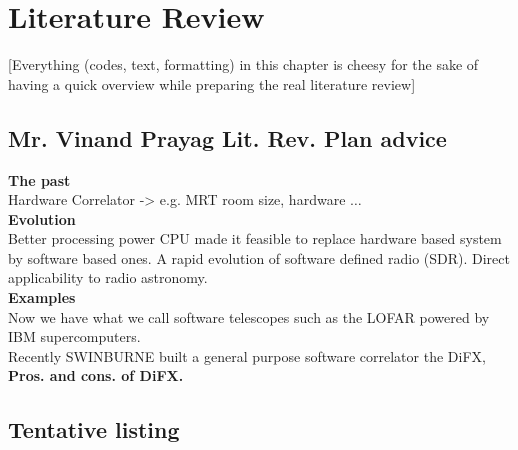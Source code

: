 \chapter{Literature Review}
\label{litReview}

[Everything (codes, text, formatting) in this chapter is cheesy for the sake of having a quick overview while preparing the real literature review]
\section{Mr. Vinand Prayag Lit. Rev. Plan advice}
\textbf{The past}\\
Hardware Correlator -> e.g. MRT room size, hardware $\ldots$\\
\textbf{Evolution}\\
Better processing power CPU made it feasible to replace hardware based system by software based ones. 
A rapid evolution of software defined radio (SDR). Direct applicability to radio astronomy.\\
\textbf{Examples}\\
Now we have what we call software telescopes such as the LOFAR powered by IBM supercomputers.\\
Recently SWINBURNE built a general purpose software correlator the DiFX,\\
\textbf{Pros. and cons. of DiFX.}


\section{Tentative listing}
\cite*{thompson2008interferometry}\\
\cite*{jdf.webinar.2}\\
\cite*{wilner.siw2014}\\
\cite*{wiki:diracComb}\\
\cite*{pjbevel.Box}\\
\cite*{britannica.Martin}\\
\cite*{britannica.Quasar}\\


